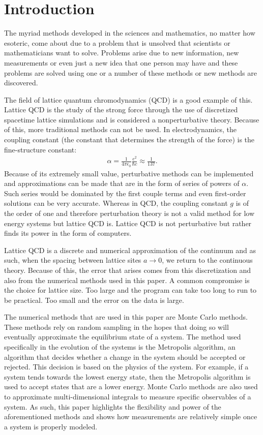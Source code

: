 \documentclass[11pt]{article}
\begin{document}
\section{Introduction}
The myriad methods developed in the sciences and mathematics, no matter how esoteric, come about due to a problem that is unsolved that scientists or mathematicians want to solve. Problems arise due to new information, new measurements or even just a new idea that one person may have and these problems are solved using one or a number of these methods or new methods are discovered.

The field of lattice quantum chromodynamics (QCD) is a good example of this. Lattice QCD is the study of the strong force through the use of discretized spacetime lattice simulations and is considered a nonperturbative theory. Because of this, more traditional methods can not be used. In electrodynamics, the coupling constant (the constant that determines the strength of the force) is the fine-structure constant:
\begin{align}
	\alpha=\frac{1}{4\pi\epsilon_0}\frac{e^2}{\hbar c}\approx\frac{1}{137}.
\end{align}
Because of its extremely small value, perturbative methods can be implemented and approximations can be made that are in the form of series of powers of $\alpha$. Such series would be dominated by the first couple terms and even first-order solutions can be very accurate. Whereas in QCD, the coupling constant $g$ is of the order of one and therefore perturbation theory is not a valid method for low energy systems but lattice QCD is. Lattice QCD is not perturbative but rather finds its power in the form of computers.

Lattice QCD is a discrete and numerical approximation of the continuum and as such, when the spacing between lattice sites $a\to0$, we return to the continuous theory. Because of this, the error that arises comes from this discretization and also from the numerical methods used in this paper. A common compromise is the choice for lattice size. Too large and the program can take too long to run to be practical. Too small and the error on the data is large. 

The numerical methods that are used in this paper are Monte Carlo methods. These methods rely on random sampling in the hopes that doing so will eventually approximate the equilibrium state of a system. The method used specifically in the evolution of the systems is the Metropolis algorithm, an algorithm that decides whether a change in the system should be accepted or rejected. This decision is based on the physics of the system. For example, if a system tends towards the lowest energy state, then the Metropolis algorithm is used to accept states that are a lower energy. Monte Carlo methods are also used to approximate multi-dimensional integrals to measure specific observables of a system. As such, this paper highlights the flexibility and power of the aforementioned methods and shows how measurements are relatively simple once a system is properly modeled.
\end{document}
